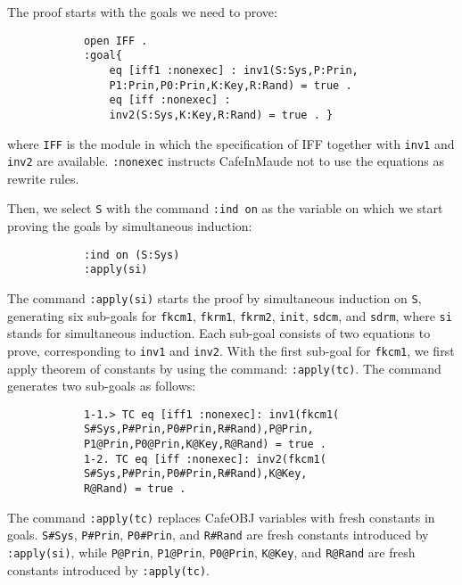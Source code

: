 \documentclass[10pt, conference, compsocconf]{IEEEtran}
\begin{document}
	The proof starts with the goals we need to prove:
	
	\begin{small}
		\begin{verbatim}
			open IFF .
			:goal{
				eq [iff1 :nonexec] : inv1(S:Sys,P:Prin,
				P1:Prin,P0:Prin,K:Key,R:Rand) = true .
				eq [iff :nonexec] : 
				inv2(S:Sys,K:Key,R:Rand) = true . }
		\end{verbatim}
	\end{small}  
	
	\noindent
	where \verb!IFF! is the module in which the specification of IFF together with \verb!inv1! and \verb!inv2! are available. \verb!:nonexec!  instructs CafeInMaude not to use the equations as rewrite
	rules.
	
	Then, we select \verb!S! with the command \verb!:ind on! as the
	variable on which we start proving the goals by simultaneous
	induction:
	
	\begin{small}
		\begin{verbatim}
			:ind on (S:Sys)
			:apply(si)
		\end{verbatim}
	\end{small}
	
	The command \verb!:apply(si)! starts the proof by simultaneous
	induction on \verb!S!, generating six sub-goals for \verb!fkcm1!,
	\verb!fkrm1!, \verb!fkrm2!, \verb!init!, \verb!sdcm!, and \verb!sdrm!, where \verb!si! stands for simultaneous induction. Each sub-goal consists of two equations to prove, corresponding to \verb!inv1! and \verb!inv2!. 
	With the first sub-goal for \verb!fkcm1!, we first apply theorem of constants by using the command: \verb!:apply(tc)!.
	The command generates two sub-goals as follows:
	
	\begin{small}
		\begin{verbatim}
			1-1.> TC eq [iff1 :nonexec]: inv1(fkcm1(
			S#Sys,P#Prin,P0#Prin,R#Rand),P@Prin,
			P1@Prin,P0@Prin,K@Key,R@Rand) = true .
			1-2. TC eq [iff :nonexec]: inv2(fkcm1(
			S#Sys,P#Prin,P0#Prin,R#Rand),K@Key,
			R@Rand) = true .
		\end{verbatim}
	\end{small}
	
	\noindent
	The command \verb!:apply(tc)! replaces CafeOBJ
	variables with fresh constants in goals. 
	\verb!S#Sys!, \verb!P#Prin!, \verb!P0#Prin!, and \verb!R#Rand! are fresh constants introduced by \verb!:apply(si)!, 
	while \verb!P@Prin!, \verb!P1@Prin!, \verb!P0@Prin!, \verb!K@Key!, and \verb!R@Rand! are fresh constants introduced by \verb!:apply(tc)!.
	
\end{document}
